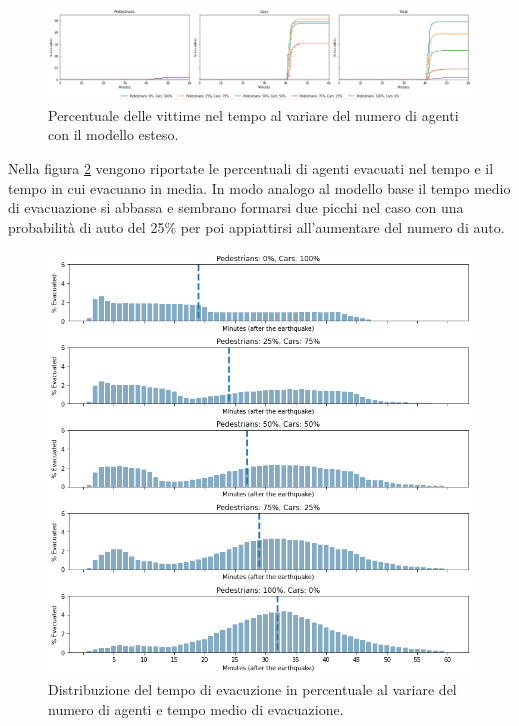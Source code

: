 \begin{figure}[ht]
    \centering
    \includegraphics[width=\textwidth]{images/analisi/new-casualties.png}
    \caption{Percentuale delle vittime nel tempo al variare del numero di agenti con il modello esteso.}
    \label{fig:analisi-new-casualties}
\end{figure}

\pagebreak

Nella figura \ref{fig:analisi-new-evtimes} vengono riportate le percentuali di agenti evacuati nel tempo
e il tempo in cui evacuano in media.
%
In modo analogo al modello base il tempo medio di evacuazione si abbassa e sembrano formarsi due picchi nel caso con una probabilità di auto del 25\% per poi appiattirsi
all'aumentare del numero di auto.


\begin{figure}
    \centering
    \includegraphics[width=\textwidth]{images/analisi/new-evtimes.png}
    \caption{Distribuzione del tempo di evacuzione in percentuale al variare del numero di agenti e tempo medio di evacuazione.}
    \label{fig:analisi-new-evtimes}
\end{figure}

